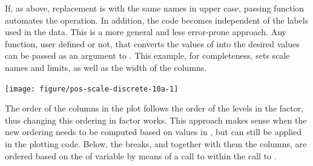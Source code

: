 \documentclass[krantz2]{krantz}\usepackage{knitr}
\begin{document}
If, as above, replacement is with the same names in upper case, passing function  automates the operation. In addition, the code becomes independent of the labels used in the data. This is a more general and less error-prone approach. Any function, user defined or not, that converts the values of  into the desired values can be passed as an argument to . This example, for completeness, sets scale names and limits, as well as the width of the columns.

\begin{knitrout}\footnotesize
{}\color{fgcolor}\begin{kframe}
\begin{alltt}
\hlstd{(} 
        \hlstd{=} \hlstd{(}    \hlopt{+}
  \hlstd{(} \hlstd{=} \hlstd{,}    \hlstd{=} \hlstd{,}  \hlstd{=} \hlstd{)} \hlopt{+}
  \hlstd{(} \hlstd{=} \hlstd{,}
                    \hlstd{=} \hlstd{(}\hlstd{,} \hlstd{,} \hlstd{),}
                     \hlopt{+}
  \hlstd{(} \hlstd{=} \hlstd{,}  \hlstd{=} \hlstd{(}\hlstd{,} \hlstd{))}
\end{alltt}
\end{kframe}

{\centering \texttt{[image: figure/pos-scale-discrete-10a-1]} 

}


\end{knitrout}

The order of the columns in the plot follows the order of the levels in the factor, thus changing this ordering in factor  works. This approach makes sense when the new ordering needs to be computed based on values in , but can still be applied in the plotting code. Below, the breaks, and together with them the columns, are ordered based on the  of variable  by means of a call to  within the call to .
\end{document}
